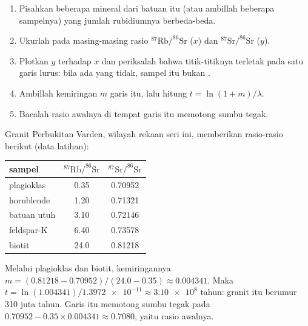 \begin{method}\label{met:g12:age-of-the-earth:isochron}
\begin{enumerate}
  \item Pisahkan beberapa mineral dari batuan itu (atau ambillah beberapa
        sampelnya) yang jumlah rubidiumnya berbeda-beda.
  \item Ukurlah pada masing-masing rasio $^{87}\mathrm{Rb}/^{86}\mathrm{Sr}$ ($x$)
        dan $^{87}\mathrm{Sr}/^{86}\mathrm{Sr}$ ($y$).
  \item Plotkan $y$ terhadap $x$ dan periksalah bahwa titik-titiknya terletak
        pada satu garis lurus: bila ada yang tidak, sampel itu bukan .
  \item Ambillah kemiringan $m$ garis itu, lalu hitung $t = \ln(1+m)/\lambda$.
  \item Bacalah rasio awalnya di tempat garis itu memotong sumbu tegak.
\end{enumerate}
\end{method}

\begin{example}\label{ex:g12:age-of-the-earth:varden}
Granit Perbukitan Varden, wilayah rekaan seri ini, memberikan rasio-rasio
berikut (data latihan):
\begin{center}
\small
\begin{tabular}{|l|c|c|}
\hline
sampel & $^{87}\mathrm{Rb}/^{86}\mathrm{Sr}$ & $^{87}\mathrm{Sr}/^{86}\mathrm{Sr}$ \\
\hline
plagioklas & 0.35 & 0.70952 \\
hornblende  & 1.20 & 0.71321 \\
batuan utuh  & 3.10 & 0.72146 \\
feldspar-K  & 6.40 & 0.73578 \\
biotit     & 24.0 & 0.81218 \\
\hline
\end{tabular}
\end{center}
Melalui plagioklas dan biotit, kemiringannya
$m = (0.81218 - 0.70952)/(24.0 - 0.35) \approx 0.004341$. Maka
$t = \ln(1.004341)/\num{1.3972e-11} \approx \num{3.10e8}$ tahun:
granit itu berumur 310 juta tahun. Garis itu memotong sumbu tegak pada
$0.70952 - 0.35 \times 0.004341 \approx 0.7080$, yaitu rasio awalnya.
\end{example}


